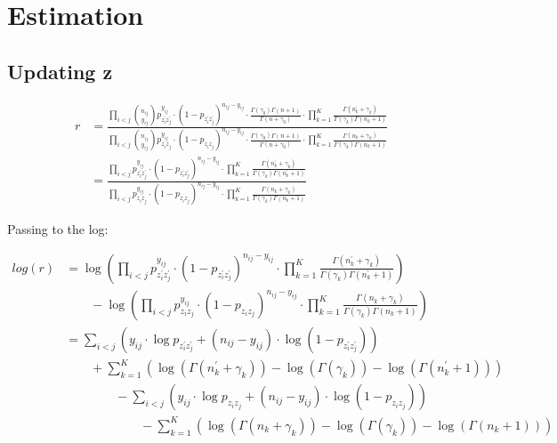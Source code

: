 \documentclass[11pt]{amsart}
\begin{document}
\section{Estimation}
 
\subsection{Updating z}

\begin{align}
r &= \frac{\prod_{i<j}\binom{n_{ij}}{y_{ij}}p_{z^{\prime}_i z^{\prime}_j}^{y_{ij}} \cdot (1 - p_{z^{\prime}_i z^{\prime}_j})^{n_{ij} - y_{ij}} \cdot \frac{\Gamma(\gamma_0) \Gamma(n+1)}{\Gamma(n + \gamma_0)} \cdot \prod_{k=1}^K \frac{\Gamma(n^{\prime}_k + \gamma_k)}{\Gamma(\gamma_k)  \Gamma(n^{\prime}_k + 1)}}{\prod_{i<j}\binom{n_{ij}}{y_{ij}}p_{z_iz_j}^{y_{ij}} \cdot (1 - p_{z_iz_j})^{n_{ij} - y_{ij}}\cdot \frac{\Gamma(\gamma_0) \Gamma(n+1)}{\Gamma(n + \gamma_0)} \cdot \prod_{k=1}^K \frac{\Gamma(n_k + \gamma_k)}{\Gamma(\gamma_k)  \Gamma(n_k + 1)}} \\
 &= \frac{\prod_{i<j}p_{z^{\prime}_i z^{\prime}_j}^{y_{ij}} \cdot (1 - p_{z^{\prime}_i z^{\prime}_j})^{n_{ij} - y_{ij}} \cdot  \prod_{k=1}^K \frac{\Gamma(n^{\prime}_k + \gamma_k)}{\Gamma(\gamma_k)  \Gamma(n^{\prime}_k + 1)}}{\prod_{i<j}p_{z_iz_j}^{y_{ij}} \cdot (1 - p_{z_iz_j})^{n_{ij} - y_{ij}} \cdot \prod_{k=1}^K \frac{\Gamma(n_k + \gamma_k)}{\Gamma(\gamma_k)  \Gamma(n_k + 1)}} 
\end{align}


Passing to the log:

\begin{align}
log(r) &= \log{ \left( \prod_{i<j}p_{z^{\prime}_i z^{\prime}_j}^{y_{ij}} \cdot (1 - p_{z^{\prime}_i z^{\prime}_j})^{n_{ij} - y_{ij}} \cdot  \prod_{k=1}^K \frac{\Gamma(n^{\prime}_k + \gamma_k)}{\Gamma(\gamma_k)  \Gamma(n^{\prime}_k + 1)} \right) }  \nonumber \\
& \qquad - \log{ \left( \prod_{i<j}p_{z_iz_j}^{y_{ij}} \cdot (1 - p_{z_iz_j})^{n_{ij} - y_{ij}} \cdot \prod_{k=1}^K \frac{\Gamma(n_k + \gamma_k)}{\Gamma(\gamma_k)  \Gamma(n_k + 1)}\right)} \nonumber \\
&= \sum_{i<j} \left(   y_{ij} \cdot \log{ p_{z^{\prime}_i z^{\prime}_j} } + (n_{ij} - y_{ij}) \cdot \log{ (1 - p_{z^{\prime}_i z^{\prime}_j}) } \right)\nonumber \\ 
&\qquad +  \sum_{k=1}^K\left(\log\left(\Gamma(n^{\prime}_{k}+\gamma_{k})\right) - \log\left(\Gamma(\gamma_{k})\right) - \log\left(\Gamma\left(n^{\prime}_{k}+1\right)\right) \right)  \nonumber  \\
& \qquad \qquad - \sum_{i<j} \left(  y_{ij} \cdot \log{ p_{z_i z_j} } + (n_{ij} - y_{ij}) \cdot \log{ (1 - p_{z_i z_j}) } \right) \nonumber \\
&\qquad \qquad \qquad - \sum_{k=1}^K\left(\log\left(\Gamma(n_{k}+\gamma_{k})\right) - \log\left(\Gamma(\gamma_{k})\right) - \log\left(\Gamma\left(n_{k}+1\right)\right) \right) \nonumber \\
\end{align}
\end{document}
